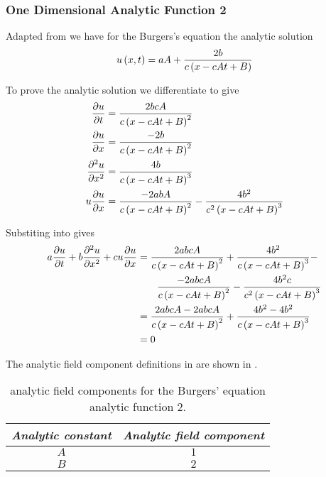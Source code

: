\subsubsection{One Dimensional Analytic Function 2}

Adapted from  we
have for the \oned Burgers's equation the analytic solution
\begin{equation}
  \fnof{u}{x,t}=aA+\dfrac{2b}{c\pbrac{x-cAt+B}}
  \label{eqn:AnalyticBurgersEquationOneDim2}
\end{equation}

To prove the analytic solution we differentiate  to give
\begin{align}
  \delby{u}{t} &= \dfrac{2bcA}{c\pbrac{x-cAt+B}^{2}} \\
  \delby{u}{x} &= \dfrac{-2b}{c\pbrac{x-cAt+B}^{2}} \\
  \deltwosqby{u}{x} &= \dfrac{4b}{c\pbrac{x-cAt+B}^{3}} \\
  u\delby{u}{x} &= \dfrac{-2abA}{c\pbrac{x-cAt+B}^{2}} - \dfrac{4b^{2}}{c^{2}\pbrac{x-cAt+B}^{3}}  \\
  \label{eqn:AnalyticBurgersEquationOneDim2Derivatives}
\end{align}

Substiting  into  gives
\begin{align}
  a \dfrac{\partial u}{\partial t} +b \dfrac{\partial^{2} u}{\partial {x}^{2}} +cu \dfrac{\partial u}{\partial x}  &=
  \dfrac{2abcA}{c\left( x-cAt+B \right)^{2}}+\dfrac{4b^{2}}{c\left( x-cAt+B \right)^{3}}- \\
  & \qquad \dfrac{-2abcA}{c\left( x-cAt+B \right)^{2}}-\dfrac{4b^{2}c}{c^{2}\left( x-cAt+B \right)^{3}} \\
  &=\dfrac{2abcA-2abcA}{c\left( x-cAt+B \right)^{2}}+\dfrac{4b^{2}-4b^{2}}{c\left( x-cAt+B \right)^{3}}\\
  &= 0
\end{align}

The analytic field component definitions in \OpenCMISS are shown in .

\begin{table}[htb] \centering
  \begin{tabular}{|c|c|} \hline
    \emph{Analytic constant} & \emph{Analytic field component} \\ \hline \hline
    $A$ & $1$ \\ 
    $B$ & $2$ \\  \hline
  \end{tabular}
  \caption{\OpenCMISS analytic field components for the \oned Burgers' equation
    analytic function 2.}
  \label{tab:OpenCMISSAnalyticFieldBurgersEquationOneDim2}
\end{table}

